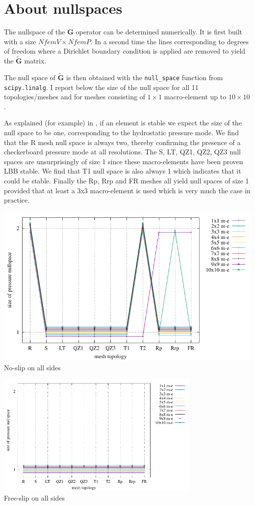 \documentclass[a4paper,12pt]{article}
\begin{document}
\newpage
\section{About nullspaces}

The nullspace of the ${ \bm G}$ operator can be determined 
numerically. It is first built with a size $NfemV \times NfemP$.
In a second time the lines corresponding to degrees of freedom 
where a Dirichlet boundary condition is applied are removed to yield
the $\tilde{\bm G}$ matrix. 

The null space of $\tilde{\bm G}$ is then obtained with the 
{\tt null\_space} function from {\tt scipy.linalg}.
I report below the size of the null space for all 11 topologies/meshes
and for meshes consisting of $1\times 1$ macro-element up to $10\times 10$.

As explained (for example) in \cite{sagl81a}, if an element is stable we 
expect the size of the null space to be one, corresponding to the 
hydrostatic pressure mode.
We find that the R mesh null space is always two, thereby confirming 
the presence of a checkerboard pressure mode at all resolutions. 
The S, LT, QZ1, QZ2, QZ3 null spaces are unsurprisingly of size 1 since 
these macro-elements have been proven LBB stable. 
We find that T1 null space is also always 1 which indicates that it could
be stable. 
Finally the Rp, Rrp and FR meshes all yield null spaces of size 1 
provided that at least a 3x3 macro-element is used which is very much the 
case in practice. 



\begin{center}
\includegraphics[width=14cm]{../results/nullspace/nullspace_NS.pdf}\\
No-slip on all sides
\end{center}


\begin{center}
\includegraphics[width=10cm]{../results/nullspace/nullspace_FS.pdf}\\
Free-slip on all sides
\end{center}
\end{document}

